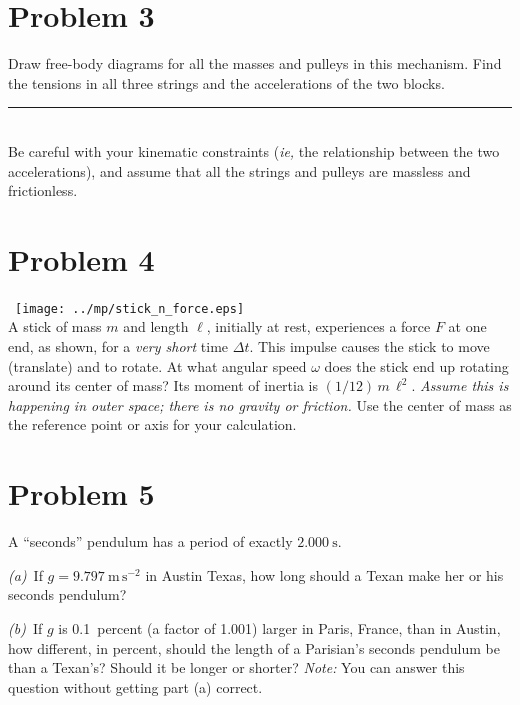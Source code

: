 \documentclass[12pt]{article}
\begin{document}
\clearpage

\section*{Problem 3}

Draw free-body diagrams for all the masses and pulleys in this
mechanism.  Find the tensions in all three strings and the
accelerations of the two blocks.
\\ \rule{0.35\textwidth}{0pt}
\\
Be careful with your kinematic constraints (\textit{ie,} the
relationship between the two accelerations), and assume that all the
strings and pulleys are massless and frictionless.

\clearpage

\section*{Problem 4}

~\hfill\texttt{[image: ../mp/stick\_n\_force.eps]}\hfill~\\ A stick of
mass $m$ and length $\ell$, initially at rest, experiences a force $F$
at one end, as shown, for a \emph{very short} time $\Delta t$.  This
impulse causes the stick to move (translate) and to rotate.  At what
angular speed $\omega$ does the stick end up rotating around its
center of mass?  Its moment of inertia is $(1/12)\,m\,\ell^2$.
\emph{Assume this is happening in outer space; there is no gravity or
friction.}  Use the center of mass as the reference point or axis for
your calculation.

\clearpage

\section*{Problem 5}

A ``seconds'' pendulum has a period of exactly $2.000~\mathrm{s}$.

\textsl{(a)}~If $g=9.797~\mathrm{m\,s^{-2}}$ in Austin Texas, how long
should a Texan make her or his seconds pendulum?

\vfill

\textsl{(b)}~If $g$ is 0.1~percent (a factor of 1.001) larger in
Paris, France, than in Austin, how different, in percent, should the
length of a Parisian's seconds pendulum be than a Texan's?  Should it
be longer or shorter?  \emph{Note:} You can answer this question
without getting part (a) correct.
\end{document}
